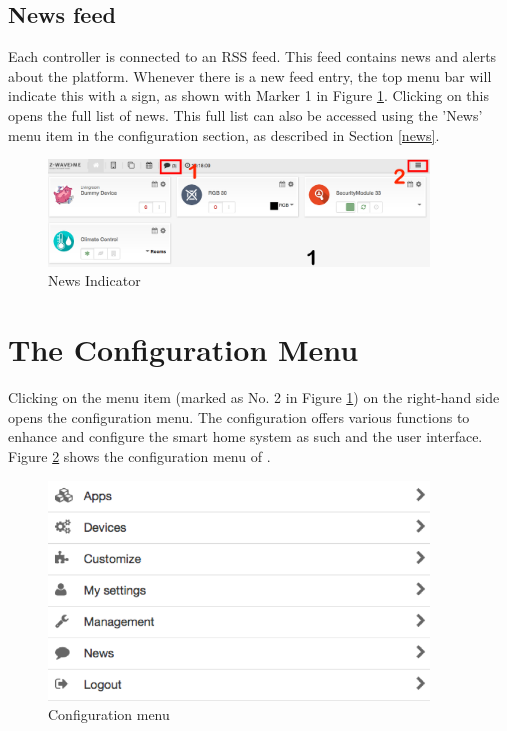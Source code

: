 \subsection{News feed}

 Each \zway controller is connected to an RSS feed. This feed contains news and alerts 
 about the platform. Whenever there is a new feed entry, the top menu bar will indicate 
 this with a sign, as shown with Marker 1 in Figure \ref{news1}. Clicking on this opens 
 the full list of news. This full list can also be accessed using the 'News' menu 
 item in the configuration section, as described in Section \ref{news}.

\begin{figure}
\begin{center}
\includegraphics[width=0.9\textwidth]{pngs/cap4/news1.png}
\caption{News Indicator}
\label{news1}
\end{center}
\end{figure}

\section{The Configuration Menu}

Clicking on the menu item (marked as No. 2 in Figure \ref{news1}) on the right-hand side 
opens the configuration menu. The configuration offers various functions to enhance and 
configure the smart home system as such and the user interface. Figure \ref{sh9} shows the configuration menu of \zway.

\begin{figure}
\begin{center}
\includegraphics[width=0.9\textwidth]{pngs/cap4/sh9.png}
\caption{Configuration menu}
\label{sh9}
\end{center}
\end{figure}



